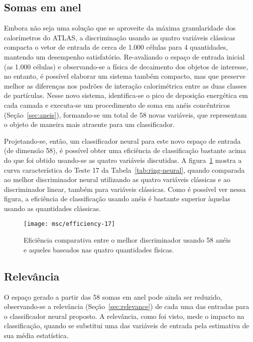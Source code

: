 \subsection{Somas em anel}

Embora não seja uma solução que se aproveite da máxima granularidade dos
calorímetros do ATLAS, a discriminação usando as quatro variáveis clássicas
compacta o vetor de entrada de cerca de 1.000 células para 4 quantidades,
mantendo um desempenho satisfatório. Re-avaliando o espaço de entrada inicial
(as 1.000 células) e observando-se a física de decaimento dos objetos de
interesse, no entanto, é possível elaborar um sistema também compacto, mas que
preserve melhor as diferenças nos padrões de interação calorimétrica entre as
duas classes de partículas. Nesse novo sistema, identifica-se o pico de
deposição energética em cada camada e executa-se um procedimento de soma em
anéis concêntricos (Seção~\ref{sec:aneis}), formando-se um total de 58 novas
variáveis, que representam o objeto de maneira mais atraente para um
classificador.

Projetando-se, então, um classificador neural para este novo espaço de
entrada (de dimensão 58), é possível obter uma eficiência de classificação
bastante acima do que foi obtido usando-se as quatro variáveis discutidas. A
figura~\ref{fig:test17} mostra a curva característica do Teste 17 da
Tabela~\ref{tab:ring-neural}, quando comparada ao melhor discriminador neural
utilizando as quatro variáveis clássicas e ao discriminador linear, também para
variáveis clássicas. Como é possível ver nessa figura, a eficiência de
classificação usando anéis é bastante superior àquelas usando as quantidades
clássicas.

\begin{figure}
\begin{center}
\texttt{[image: msc/efficiency-17]}
\end{center}
\caption{Eficiência comparativa entre o melhor discriminador usando 58 anéis e
aqueles baseados nas quatro quantidades físicas.}
\label{fig:test17}
\end{figure}

\subsection{Relevância}

O espa\-ço gerado a partir das 58 somas em anel pode ainda ser reduzido,
observando-se a rele\-vân\-cia (Se\-ção~\ref{sec:relevance}) de cada uma das
entradas para o classificador neural proposto. A relevância, como foi visto,
mede o impacto na classificação, quando se substitui uma das variáveis de
entrada pela estimativa de sua média estatística.

